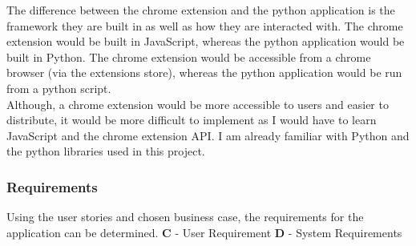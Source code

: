 The difference between the chrome extension and the python application is the framework they are built in as well as how
they are interacted with. The chrome extension would be built in JavaScript, whereas the python application would be built in Python.
The chrome extension would be accessible from a chrome browser (via the extensions store), whereas the python application would be
run from a python script.\\
Although, a chrome extension would be more accessible to users and easier to distribute, it would be more difficult to implement
as I would have to learn JavaScript and the chrome extension API. I am already familiar with Python and the python libraries used
in this project.
\subsubsection{Requirements}\label{sec:requirements}
Using the user stories and chosen business case, the requirements for the application can be determined. \textbf{C} - User Requirement
\textbf{D} - System Requirements
